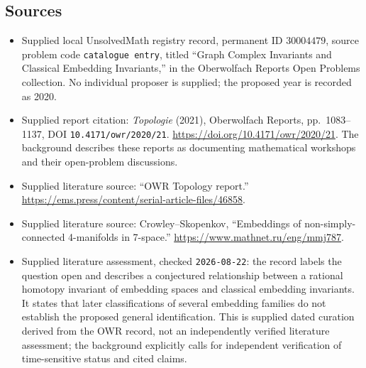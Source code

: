 \documentclass[11pt]{article}
\begin{document}
\subsection{Sources}
\begin{itemize}
\item Supplied local UnsolvedMath registry record, permanent ID \(30004479\), source problem code \texttt{catalogue entry}, titled ``Graph Complex Invariants and Classical Embedding Invariants,'' in the Oberwolfach Reports Open Problems collection. No individual proposer is supplied; the proposed year is recorded as 2020.
\item Supplied report citation: \emph{Topologie} (2021), Oberwolfach Reports, pp.\ 1083--1137, DOI \texttt{10.4171/owr/2020/21}. \url{https://doi.org/10.4171/owr/2020/21}. The background describes these reports as documenting mathematical workshops and their open-problem discussions.
\item Supplied literature source: ``OWR Topology report.'' \url{https://ems.press/content/serial-article-files/46858}.
\item Supplied literature source: Crowley--Skopenkov, ``Embeddings of non-simply-connected 4-manifolds in 7-space.'' \url{https://www.mathnet.ru/eng/mmj787}.
\item Supplied literature assessment, checked \texttt{2026-08-22}: the record labels the question open and describes a conjectured relationship between a rational homotopy invariant of embedding spaces and classical embedding invariants. It states that later classifications of several embedding families do not establish the proposed general identification. This is supplied dated curation derived from the OWR record, not an independently verified literature assessment; the background explicitly calls for independent verification of time-sensitive status and cited claims.
\end{itemize}
\end{document}
